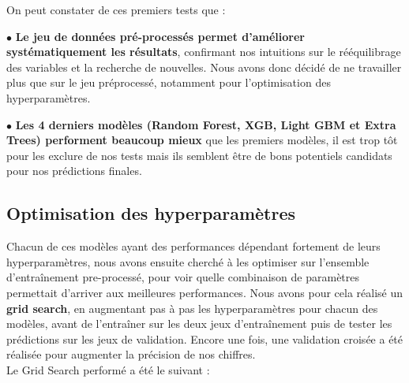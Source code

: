 \documentclass{article}
\begin{document}
On peut constater de ces premiers tests que : 

$\bullet$  \textbf{Le jeu de données pré-processés permet d'améliorer systématiquement les résultats}, confirmant nos intuitions sur le rééquilibrage des variables et la recherche de nouvelles. Nous avons donc décidé de ne travailler plus que sur le jeu préprocessé, notamment pour l'optimisation des hyperparamètres. 

$\bullet$ \textbf{Les 4 derniers modèles (Random Forest, XGB, Light GBM et Extra Trees) performent beaucoup mieux} que les premiers modèles, il est trop tôt pour les exclure de nos tests mais ils semblent être de bons potentiels candidats pour nos prédictions finales.


\newpage

\subsection{Optimisation des hyperparamètres}

Chacun de ces modèles ayant des performances dépendant fortement de leurs hyperparamètres, nous avons ensuite cherché à les optimiser sur l'ensemble d'entraînement pre-processé, pour voir quelle combinaison de paramètres permettait d'arriver aux meilleures performances. Nous avons pour cela réalisé un \textbf{grid search}, en augmentant pas à pas les hyperparamètres pour chacun des modèles, avant de l'entraîner sur les deux jeux d'entraînement puis de tester les prédictions sur les jeux de validation. Encore une fois, une validation croisée a été réalisée pour augmenter la précision de nos chiffres.  \\ 

Le Grid Search performé a été le suivant : 
\\
\end{document}
